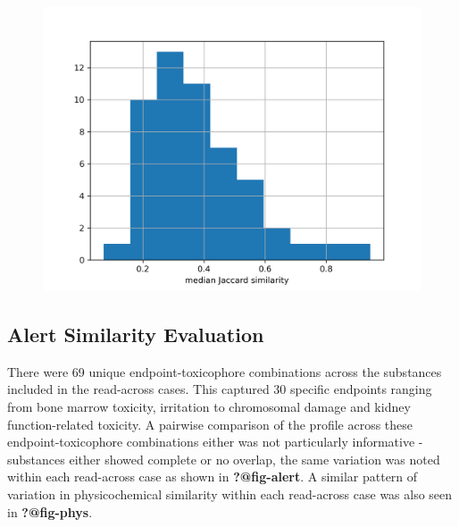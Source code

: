 \documentclass[
  super,
  preprint,
  3p]{elsarticle}
\begin{document}
\begin{figure}

\begin{minipage}{0.50\linewidth}

\includegraphics{median_JS_dist.png}

\end{minipage}%

\end{figure}%

\subsection{Alert Similarity
Evaluation}\label{alert-similarity-evaluation}

There were 69 unique endpoint-toxicophore combinations across the
substances included in the read-across cases. This captured 30 specific
endpoints ranging from bone marrow toxicity, irritation to chromosomal
damage and kidney function-related toxicity. A pairwise comparison of
the profile across these endpoint-toxicophore combinations either was
not particularly informative - substances either showed complete or no
overlap, the same variation was noted within each read-across case as
shown in \textbf{?@fig-alert}. A similar pattern of variation in
physicochemical similarity within each read-across case was also seen in
\textbf{?@fig-phys}.
\end{document}
